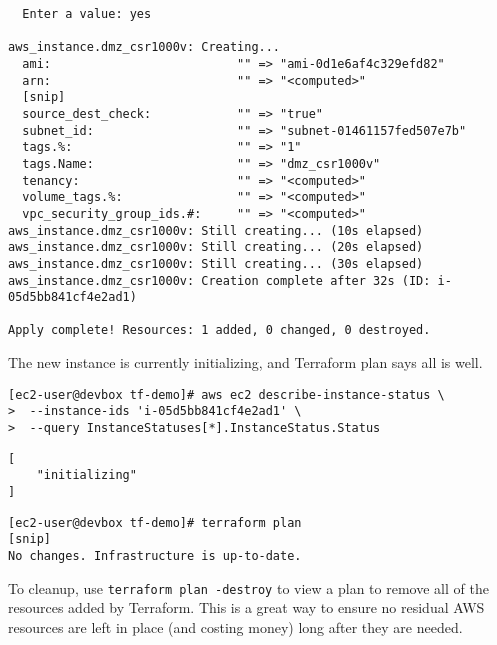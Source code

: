 \begin{verbatim}
  Enter a value: yes

aws_instance.dmz_csr1000v: Creating...
  ami:                          "" => "ami-0d1e6af4c329efd82"
  arn:                          "" => "<computed>"
  [snip]
  source_dest_check:            "" => "true"
  subnet_id:                    "" => "subnet-01461157fed507e7b"
  tags.%:                       "" => "1"
  tags.Name:                    "" => "dmz_csr1000v"
  tenancy:                      "" => "<computed>"
  volume_tags.%:                "" => "<computed>"
  vpc_security_group_ids.#:     "" => "<computed>"
aws_instance.dmz_csr1000v: Still creating... (10s elapsed)
aws_instance.dmz_csr1000v: Still creating... (20s elapsed)
aws_instance.dmz_csr1000v: Still creating... (30s elapsed)
aws_instance.dmz_csr1000v: Creation complete after 32s (ID: i-05d5bb841cf4e2ad1)

Apply complete! Resources: 1 added, 0 changed, 0 destroyed.
\end{verbatim}

The new instance is currently initializing, and Terraform plan says all is well.

\begin{verbatim}
[ec2-user@devbox tf-demo]# aws ec2 describe-instance-status \
>  --instance-ids 'i-05d5bb841cf4e2ad1' \
>  --query InstanceStatuses[*].InstanceStatus.Status
\end{verbatim}

\begin{verbatim}
[
    "initializing"
]
\end{verbatim}

\begin{verbatim}
[ec2-user@devbox tf-demo]# terraform plan
[snip]
No changes. Infrastructure is up-to-date.
\end{verbatim}

To cleanup, use \verb|terraform plan -destroy| to view a plan to remove all of the
resources added by Terraform. This is a great way to ensure no residual AWS
resources are left in place (and costing money) long after they are needed.

